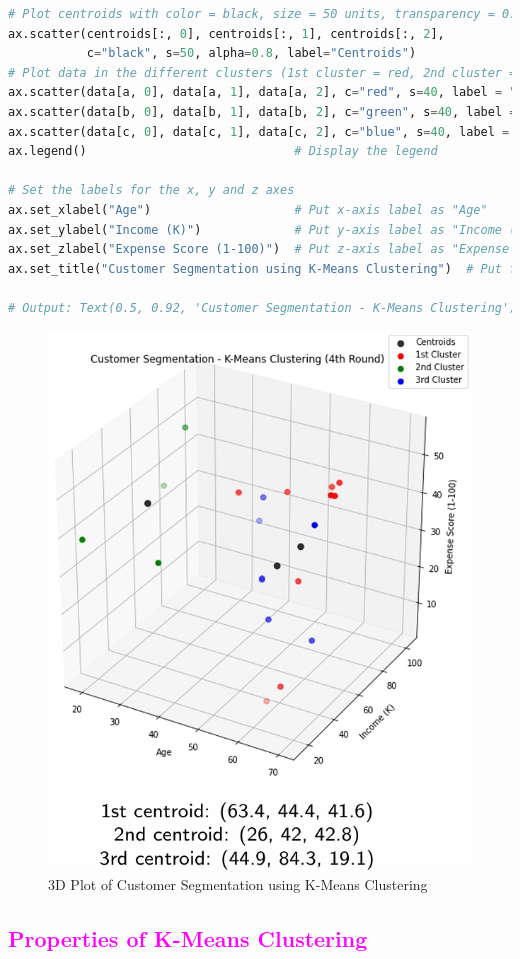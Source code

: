 \documentclass{book}
\begin{document}
\begin{lstlisting}[language=Python, basicstyle=\ttfamily\small, keywordstyle=\color{blue}, commentstyle=\color{forestgreen}, stringstyle=\color{red}, showstringspaces=false]
# Plot centroids with color = black, size = 50 units, transparency = 0.2 and put a label "Centroids"
ax.scatter(centroids[:, 0], centroids[:, 1], centroids[:, 2],
           c="black", s=50, alpha=0.8, label="Centroids")
# Plot data in the different clusters (1st cluster = red, 2nd cluster = green, 3rd cluster = blue)
ax.scatter(data[a, 0], data[a, 1], data[a, 2], c="red", s=40, label = "1st Cluster")
ax.scatter(data[b, 0], data[b, 1], data[b, 2], c="green", s=40, label = "2nd Cluster")
ax.scatter(data[c, 0], data[c, 1], data[c, 2], c="blue", s=40, label = "3rd Cluster")
ax.legend()                             # Display the legend

# Set the labels for the x, y and z axes
ax.set_xlabel("Age")                    # Put x-axis label as "Age"
ax.set_ylabel("Income (K)")             # Put y-axis label as "Income (K)"
ax.set_zlabel("Expense Score (1-100)")  # Put z-axis label as "Expense Score"
ax.set_title("Customer Segmentation using K-Means Clustering")  # Put figure title

# Output: Text(0.5, 0.92, 'Customer Segmentation - K-Means Clustering')
\end{lstlisting}
\begin{figure}[h]
    \centering
    \includegraphics[scale=0.24]{chapter 5/ch5_figure8.jpeg}
    \caption{3D Plot of Customer Segmentation using K-Means Clustering}
\end{figure}
\newpage
\textcolor{magenta}{\section{\textbf{Properties of K-Means Clustering}}}
\end{document}
